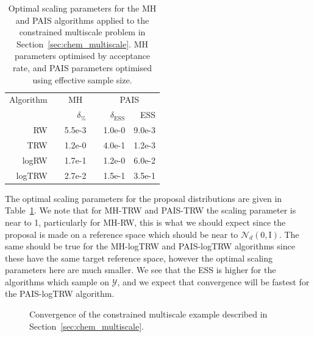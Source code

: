 \documentclass[final]{siamltex}
\begin{document}
\begin{table}[!h]
\centering
\begin{tabular}{rrrrrr}
\toprule
	\multicolumn{1}{l}{Algorithm} & \multicolumn{3}{c}{MH} & \multicolumn{2}{c}{PAIS} \\ \cmidrule(lr){2-4} \cmidrule(lr){5-6}
	& & $\delta_\%$ & & $\delta_{\text{ESS}}$ & ESS \\ \midrule
	RW & & 5.5e-3 & & 1.0e-0 & 9.0e-3 \\
	TRW & & 1.2e-0 & & 4.0e-1 & 1.2e-3 \\
	logRW & & 1.7e-1 & & 1.2e-0 & 6.0e-2 \\
	logTRW & & 2.7e-2 & & 1.5e-1 & 3.5e-1 \\
\bottomrule
\end{tabular}
\caption{Optimal scaling parameters for the MH and PAIS algorithms applied to the constrained multiscale problem in Section~\ref{sec:chem_multiscale}. MH parameters optimised by acceptance rate, and PAIS parameters optimised using effective sample size.}
\label{tab:chem_multiscale_scaling}
\end{table}

The optimal scaling parameters for the proposal distributions are given in Table~\ref{tab:chem_multiscale_scaling}. We note that for MH-TRW and PAIS-TRW the scaling parameter is near to 1, particularly for MH-RW, this is what we should expect since the proposal is made on a reference space which should be near to $\mathcal{N}_d(0, \text{I})$. The same should be true for the MH-logTRW and PAIS-logTRW algorithms since these have the same target reference space, however the optimal scaling parameters here are much smaller. We see that the ESS is higher for the algorithms which sample on $\mathcal{Y}$, and we expect that convergence will be fastest for the PAIS-logTRW algorithm.

\begin{figure}[!htb]
\centering
{}
\caption{Convergence of the constrained multiscale example described in Section~\ref{sec:chem_multiscale}.}
\label{fig:chem_multiscale_L2}
\end{figure}
\end{document}
